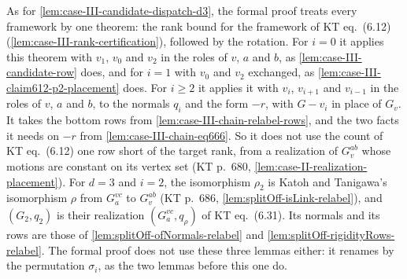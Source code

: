 \begin{fmlnote}
  As for \cref{lem:case-III-candidate-dispatch-d3}, the formal proof
  treats every framework by one theorem: the rank bound for the
  framework of KT eq.~(6.12) (\cref{lem:case-III-rank-certification}),
  followed by the rotation. For $i = 0$ it applies this theorem with
  $v_1$, $v_0$ and $v_2$ in the roles of $v$, $a$ and $b$, as
  \cref{lem:case-III-candidate-row} does, and for $i = 1$ with $v_0$ and
  $v_2$ exchanged, as \cref{lem:case-III-claim612-p2-placement} does. For
  $i \ge 2$ it applies it with $v_i$, $v_{i+1}$ and $v_{i-1}$ in the
  roles of $v$, $a$ and $b$, to the normals $q_i$ and the form $-r$, with
  $G - v_i$ in place of $G_v$. It takes the bottom rows from
  \cref{lem:case-III-chain-relabel-rows}, and the two facts it needs on
  $-r$ from \cref{lem:case-III-chain-eq666}. So it does not use the
  count of KT eq.~(6.12) one row short of the target rank, from a
  realization of $G_v^{ab}$ whose motions are constant on its vertex set
  (KT p.~680, \cref{lem:case-II-realization-placement}). For $d = 3$ and
  $i = 2$, the isomorphism $\rho_2$ is Katoh and Tanigawa's isomorphism
  $\rho$ from $G_a^{vc}$ to $G_v^{ab}$ (KT p.~686,
  \cref{lem:splitOff-isLink-relabel}), and $(G_2, q_2)$ is their
  realization $(G_a^{vc}, q_\rho)$ of KT eq.~(6.31). Its normals and its
  rows are those of \cref{lem:splitOff-ofNormals-relabel} and
  \cref{lem:splitOff-rigidityRows-relabel}. The formal proof does not
  use these three lemmas either: it renames by the permutation
  $\sigma_i$, as the two lemmas before this one do.
\end{fmlnote}

